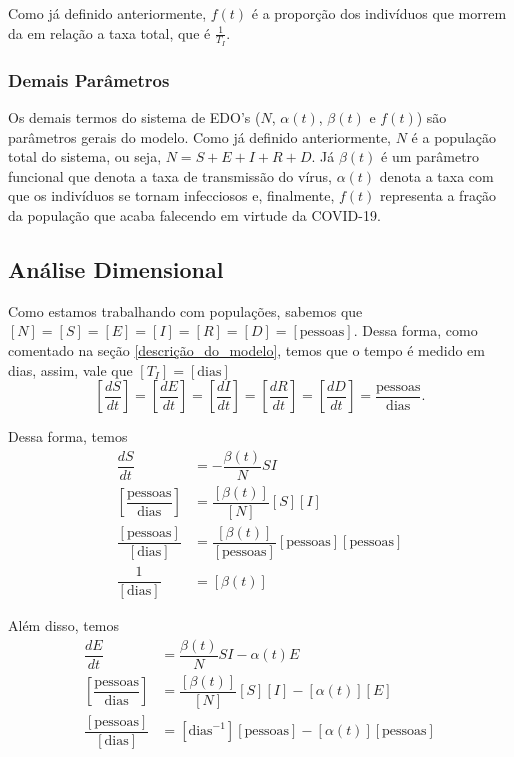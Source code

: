 \documentclass{article}
\begin{document}
Como já definido anteriormente, $f(t)$ é a proporção dos indivíduos que morrem da em relação a taxa total, que é $\frac{1}{T_I}$. 

\subsubsection{Demais Parâmetros}

Os demais termos do sistema de EDO's ($N$, $\alpha(t)$, $\beta(t)$ e $f(t)$) são parâmetros gerais do modelo. Como já definido anteriormente, $N$ é a população total do sistema, ou seja, $N = S + E + I + R + D$. Já $\beta(t)$ é um parâmetro funcional que denota a taxa de transmissão do vírus, $\alpha(t)$ denota a taxa com que os indivíduos se tornam infecciosos e, finalmente, $f(t)$ representa a fração da população que acaba falecendo em virtude da COVID-19.

\subsection{Análise Dimensional} \label{analise_dimensional}

Como estamos trabalhando com populações, sabemos que $[N] = [S] = [E] = [I] = [R] = [D] = [\text{pessoas}]$. Dessa forma, como comentado na seção \ref{descrição_do_modelo}, temos que o tempo é medido em dias, assim, vale que $[T_I] = [\text{dias}]$
\[\left[\dfrac{dS}{dt}\right] = \left[\dfrac{dE}{dt}\right] = \left[\dfrac{dI}{dt}\right] = \left[\dfrac{dR}{dt}\right] = \left[\dfrac{dD}{dt}\right] = \dfrac{\text{pessoas}}{\text{dias}}.\]

Dessa forma, temos
\begin{equation*}
    \begin{split}
        \dfrac{dS}{dt} & = -\dfrac{\beta(t)}{N}SI \\
        \left[\dfrac{\text{pessoas}}{\text{dias}}\right] & = \dfrac{[\beta(t)]}{[N]}[S][I] \\
        \dfrac{[\text{pessoas}]}{[\text{dias}]} & = \dfrac{[\beta(t)]}{[\text{pessoas}]}[\text{pessoas}][\text{pessoas}] \\
        \dfrac{1}{[\text{dias}]} & = [\beta(t)]
    \end{split}
\end{equation*}

Além disso, temos
\begin{equation*}
    \begin{split}
        \dfrac{dE}{dt} & = \dfrac{\beta(t)}{N}SI - \alpha(t) E \\
        \left[\dfrac{\text{pessoas}}{\text{dias}}\right] & = \dfrac{[\beta(t)]}{[N]}[S][I] - [\alpha(t)][E] \\
        \dfrac{[\text{pessoas}]}{[\text{dias}]} & = [\text{dias}^{-1}][\text{pessoas}] - [\alpha(t)][\text{pessoas}]
    \end{split}
\end{equation*}
\end{document}
